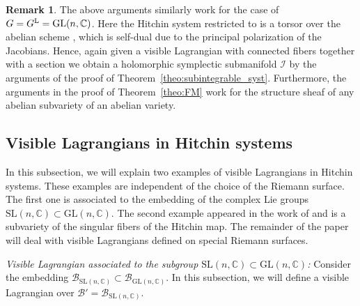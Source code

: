 \documentclass[10pt,a4paper]{amsart}
\numberwithin{equation}{section}
\theoremstyle{definition}
\newtheorem{rema}[theo]{Remark}
\newcommand{\reg}{\mathrm{reg}}
\newcommand{\Jac}{\mathrm{Jac}}
\renewcommand{\to}{\rightarrow}
\newcommand{\calB}{\mathcal{B}}
\newcommand{\calI}{\mathcal{I}}
\newcommand{\CC}{\mathbb{C}}
\newcommand{\GL}{\mathrm{GL}}
\newcommand{\SL}{\mathrm{SL}}
\begin{document}
\begin{rema}\label{rema:GL} The above arguments similarly work for the case of $G=G^{\rm L}=\GL(n,\CC)$. Here the Hitchin system restricted to \smash{$\calB_{\GL(n,\CC)}^{\reg}$} is a torsor over the abelian scheme \smash{$\Jac(\Sigma) \to \calB_{\GL(n,\CC)}^{\reg}$}, which is self-dual due to the principal polarization of the Jacobians. Hence, again given a visible Lagrangian with connected fibers together with a section we obtain a holomorphic symplectic submanifold $\calI$ by the arguments of the proof of Theorem~\ref{theo:subintegrable_syst}. Furthermore, the arguments in the proof of Theorem~\ref{theo:FM} work for the structure sheaf of any abelian subvariety of an abelian variety.
\end{rema}

\subsection{Visible Lagrangians in Hitchin systems}\label{sec:visi_Lagra_Hitchin}
In this subsection, we will explain two examples of visible Lagrangians in Hitchin systems. These examples are independent of the choice of the Riemann surface. The first one is associated to the embedding of the complex Lie groups $\SL(n,\CC) \subset \GL(n,\CC)$. The second example appeared in the work of \cite{FGOP} and is a subvariety of the singular fibers of the Hitchin map. The remainder of the paper will deal with visible Lagrangians defined on special Riemann surfaces.

\textit{Visible Lagrangian associated to the subgroup $\SL(n,\CC) \subset \GL(n,\CC)$:}
Consider the embedding $\calB_{\SL(n,\CC)} \subset \calB_{\GL(n,\CC)}$. In this subsection, we will define a visible Lagrangian over $\calB'=\calB_{\SL(n,\CC)}$.
\end{document}
